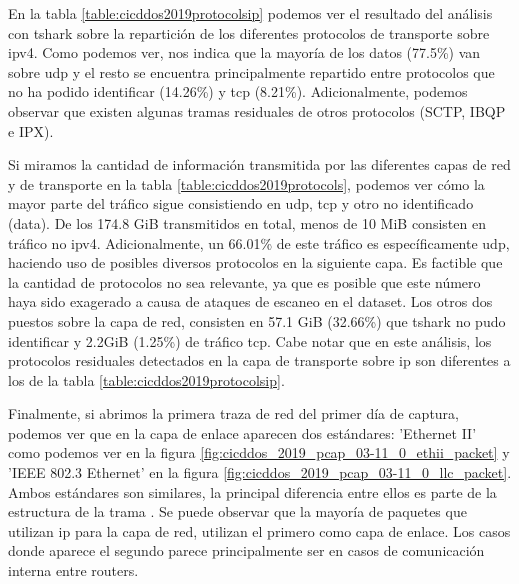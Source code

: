En la tabla \ref{table:cicddos2019protocolsip} podemos ver el resultado del análisis con tshark sobre la repartición de los diferentes protocolos de transporte sobre \acrshort{ipv4}. Como podemos ver, nos indica que la mayoría de los datos (77.5\%) van sobre \acrshort{udp} y el resto se encuentra principalmente repartido entre protocolos que no ha podido identificar (14.26\%) y \acrshort{tcp} (8.21\%). Adicionalmente, podemos observar que existen algunas tramas residuales de otros protocolos (SCTP, IBQP e IPX).



Si miramos la cantidad de información transmitida por las diferentes capas de red y de transporte en la tabla \ref{table:cicddos2019protocols}, podemos ver cómo la mayor parte del tráfico sigue consistiendo en \acrshort{udp}, \acrshort{tcp} y otro no identificado (data). De los 174.8 GiB transmitidos en total, menos de 10 MiB consisten en tráfico no \acrshort{ipv4}. Adicionalmente, un 66.01\% de este tráfico es específicamente \acrshort{udp}, haciendo uso de posibles diversos protocolos en la siguiente capa. Es factible que la cantidad de protocolos no sea relevante, ya que es posible que este número haya sido exagerado a causa de ataques de escaneo en el dataset. Los otros dos puestos sobre la capa de red, consisten en 57.1 GiB (32.66\%) que tshark no pudo identificar y 2.2GiB (1.25\%) de tráfico \acrshort{tcp}. Cabe notar que en este análisis, los protocolos residuales detectados en la capa de transporte sobre \acrshort{ip} son diferentes a los de la tabla \ref{table:cicddos2019protocolsip}.



Finalmente, si abrimos la primera traza de red del primer día de captura, podemos ver que en la capa de enlace aparecen dos estándares: 'Ethernet II' como podemos ver en la figura \ref{fig:cicddos_2019_pcap_03-11_0_ethii_packet} y 'IEEE 802.3 Ethernet' en la figura \ref{fig:cicddos_2019_pcap_03-11_0_llc_packet}. Ambos estándares son similares, la principal diferencia entre ellos es parte de la estructura de la trama \cite{IBMeth2vsllc}. Se puede observar que la mayoría de paquetes que utilizan \acrshort{ip} para la capa de red, utilizan el primero como capa de enlace. Los casos donde aparece el segundo parece principalmente ser en casos de comunicación interna entre routers.

